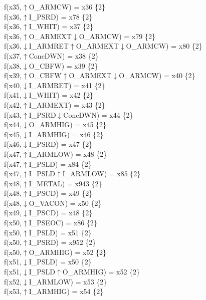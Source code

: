 f(x35,$\uparrow$O\_ARMCW) = x36 \{2\} \\  
f(x36,$\uparrow$I\_PSRD) = x78 \{2\} \\  
f(x36,$\uparrow$I\_WHIT) = x37 \{2\} \\  
f(x36,$\uparrow$O\_ARMEXT$\downarrow$O\_ARMCW) = x79 \{2\} \\  
f(x36,$\downarrow$I\_ARMRET$\uparrow$O\_ARMEXT$\downarrow$O\_ARMCW) = x80 \{2\} \\  
f(x37,$\uparrow$ConcDWN) = x38 \{2\} \\  
f(x38,$\downarrow$O\_CBFW) = x39 \{2\} \\  
f(x39,$\uparrow$O\_CBFW$\uparrow$O\_ARMEXT$\downarrow$O\_ARMCW) = x40 \{2\} \\  
f(x40,$\downarrow$I\_ARMRET) = x41 \{2\} \\  
f(x41,$\downarrow$I\_WHIT) = x42 \{2\} \\  
f(x42,$\uparrow$I\_ARMEXT) = x43 \{2\} \\  
f(x43,$\uparrow$I\_PSRD$\downarrow$ConcDWN) = x44 \{2\} \\  
f(x44,$\downarrow$O\_ARMHIG) = x45 \{2\} \\  
f(x45,$\downarrow$I\_ARMHIG) = x46 \{2\} \\  
f(x46,$\downarrow$I\_PSRD) = x47 \{2\} \\  
f(x47,$\uparrow$I\_ARMLOW) = x48 \{2\} \\  
f(x47,$\uparrow$I\_PSLD) = x84 \{2\} \\  
f(x47,$\uparrow$I\_PSLD$\uparrow$I\_ARMLOW) = x85 \{2\} \\  
f(x48,$\uparrow$I\_METAL) = x943 \{2\} \\  
f(x48,$\uparrow$I\_PSCD) = x49 \{2\} \\  
f(x48,$\downarrow$O\_VACON) = x50 \{2\} \\  
f(x49,$\downarrow$I\_PSCD) = x48 \{2\} \\  
f(x50,$\uparrow$I\_PSEOC) = x86 \{2\} \\  
f(x50,$\uparrow$I\_PSLD) = x51 \{2\} \\  
f(x50,$\uparrow$I\_PSRD) = x952 \{2\} \\  
f(x50,$\uparrow$O\_ARMHIG) = x52 \{2\} \\  
f(x51,$\downarrow$I\_PSLD) = x50 \{2\} \\  
f(x51,$\downarrow$I\_PSLD$\uparrow$O\_ARMHIG) = x52 \{2\} \\  
f(x52,$\downarrow$I\_ARMLOW) = x53 \{2\} \\  
f(x53,$\uparrow$I\_ARMHIG) = x54 \{2\} \\  
